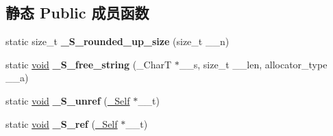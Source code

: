 \subsection*{静态 Public 成员函数}
\begin{DoxyCompactItemize}
\item 
\mbox{\label{struct___rope___rope_rep_a82555e71e05ea74367c0b825dd99aa25}} 
static size\+\_\+t {\bfseries \+\_\+\+S\+\_\+rounded\+\_\+up\+\_\+size} (size\+\_\+t \+\_\+\+\_\+n)
\item 
\mbox{\label{struct___rope___rope_rep_a3d202f610eaa2ed6cd1c520dc087fff9}} 
static \hyperlink{interfacevoid}{void} {\bfseries \+\_\+\+S\+\_\+free\+\_\+string} (\+\_\+\+CharT $\ast$\+\_\+\+\_\+s, size\+\_\+t \+\_\+\+\_\+len, allocator\+\_\+type \+\_\+\+\_\+a)
\item 
\mbox{\label{struct___rope___rope_rep_a83b5d734e4f814b9a0cb4390f765b7e8}} 
static \hyperlink{interfacevoid}{void} {\bfseries \+\_\+\+S\+\_\+unref} (\hyperlink{struct___rope___rope_rep}{\+\_\+\+Self} $\ast$\+\_\+\+\_\+t)
\item 
\mbox{\label{struct___rope___rope_rep_a66f30136be471e07ce221a1130d82621}} 
static \hyperlink{interfacevoid}{void} {\bfseries \+\_\+\+S\+\_\+ref} (\hyperlink{struct___rope___rope_rep}{\+\_\+\+Self} $\ast$\+\_\+\+\_\+t)
\end{DoxyCompactItemize}
